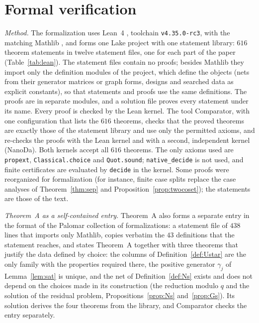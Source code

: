 \documentclass[11pt]{amsart}
\theoremstyle{definition}
\theoremstyle{plain}
\begin{document}
\clearpage
\section{Formal verification}\label{app:formal}
\emph{Method.} The formalization uses Lean~4 \cite{dMU21}, toolchain \texttt{v4.35.0-rc3}, with the matching Mathlib \cite{Mathlib20}, and forms one Lake project with one statement library: $616$ theorem statements in twelve statement files, one for each part of the paper (Table~\ref{tab:lean}). The statement files contain no proofs; besides Mathlib they import only the definition modules of the project, which define the objects (nets from their generator matrices or graph forms, designs and searched data as explicit constants), so that statements and proofs use the same definitions. The proofs are in separate modules, and a solution file proves every statement under its name. Every proof is checked by the Lean kernel. The tool Comparator, with one configuration that lists the $616$ theorems, checks that the proved theorems are exactly those of the statement library and use only the permitted axioms, and re-checks the proofs with the Lean kernel and with a second, independent kernel (NanoDa).
Both kernels accept all $616$ theorems.
The only axioms used are \texttt{propext}, \texttt{Classical.choice} and \texttt{Quot.sound}; \texttt{native\_decide} is not used, and finite certificates are evaluated by \texttt{decide} in the kernel. Some proofs were reorganized for formalization (for instance, finite case splits replace the case analyses of Theorem~\ref{thm:sep} and Proposition~\ref{prop:twocoset}); the statements are those of the text.

\emph{Theorem~A as a self-contained entry.} Theorem~A also forms a separate entry in the format of the Palomar collection of formalizations: a statement file of $438$ lines that imports only Mathlib, copies verbatim the $43$ definitions that the statement reaches, and states Theorem~A together with three theorems that justify the data defined by choice: the columns of Definition~\ref{def:Ustar} are the only family with the properties required there, the positive generator $\gamma_j$ of Lemma~\ref{lem:sat} is unique, and the net of Definition~\ref{def:Ns} exists and does not depend on the choices made in its construction (the reduction modulo $q$ and the solution of the residual problem, Propositions~\ref{prop:Ns} and~\ref{prop:Gs}). Its solution derives the four theorems from the library, and Comparator checks the entry separately.
\end{document}
